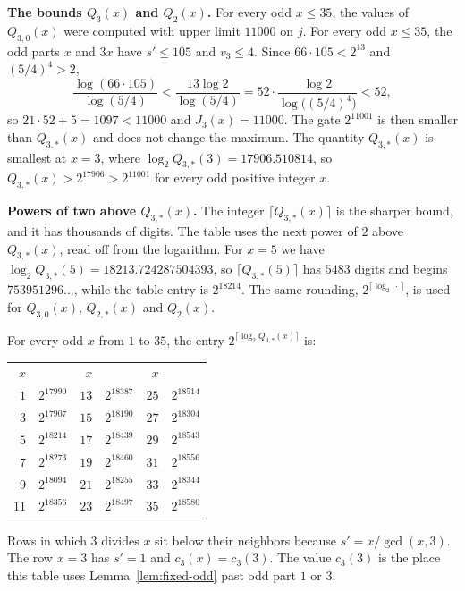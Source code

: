 \documentclass[11pt]{article}
\newcommand{\topic}[1]{\par\noindent\textbf{#1}}
\begin{document}
\topic{The bounds $Q_3(x)$ and $Q_2(x)$.}
For every odd $x \le 35$, the values of $Q_{3,0}(x)$ were computed with upper limit $11000$ on $j$.
For every odd $x \le 35$, the odd parts $x$ and $3x$ have $s' \le 105$ and $v_3 \le 4$.
Since $66 \cdot 105 < 2^{13}$ and $(5/4)^4 > 2$,
\[
\frac{\log(66 \cdot 105)}{\log(5/4)}
< \frac{13\log 2}{\log(5/4)}
= 52 \cdot \frac{\log 2}{\log\bigl((5/4)^4\bigr)}
< 52,
\]
so $21 \cdot 52 + 5 = 1097 < 11000$ and $J_3(x) = 11000$.
The gate $2^{11001}$ is then smaller than $Q_{3,*}(x)$ and does not change the maximum.
The quantity $Q_{3,*}(x)$ is smallest at $x = 3$, where $\log_2 Q_{3,*}(3) = 17906.510814$, so $Q_{3,*}(x) > 2^{17906} > 2^{11001}$ for every odd positive integer $x$.

\topic{Powers of two above $Q_{3,*}(x)$.}
The integer $\lceil Q_{3,*}(x) \rceil$ is the sharper bound, and it has thousands of digits.
The table uses the next power of $2$ above $Q_{3,*}(x)$, read off from the logarithm.
For $x = 5$ we have $\log_2 Q_{3,*}(5) = 18213.724287504393$, so $\lceil Q_{3,*}(5) \rceil$ has $5483$ digits and begins $753951296\ldots$, while the table entry is $2^{18214}$.
The same rounding, $2^{\lceil \log_2 \,\cdot\, \rceil}$, is used for $Q_{3,0}(x)$, $Q_{2,*}(x)$ and $Q_2(x)$.

For every odd $x$ from $1$ to $35$, the entry $2^{\lceil \log_2 Q_{3,*}(x) \rceil}$ is:

\begin{center}
\begin{tabular}{rrrrrr}
$x$ & & $x$ & & $x$ & \\
$1$ & $2^{17990}$ & $13$ & $2^{18387}$ & $25$ & $2^{18514}$ \\
$3$ & $2^{17907}$ & $15$ & $2^{18190}$ & $27$ & $2^{18304}$ \\
$5$ & $2^{18214}$ & $17$ & $2^{18439}$ & $29$ & $2^{18543}$ \\
$7$ & $2^{18273}$ & $19$ & $2^{18460}$ & $31$ & $2^{18556}$ \\
$9$ & $2^{18094}$ & $21$ & $2^{18255}$ & $33$ & $2^{18344}$ \\
$11$ & $2^{18356}$ & $23$ & $2^{18497}$ & $35$ & $2^{18580}$ \\
\end{tabular}
\end{center}

Rows in which $3$ divides $x$ sit below their neighbors because $s' = x/\gcd(x, 3)$.
The row $x = 3$ has $s' = 1$ and $c_3(x) = c_3(3)$.
The value $c_3(3)$ is the place this table uses Lemma~\ref{lem:fixed-odd} past odd part $1$ or $3$.
\end{document}
